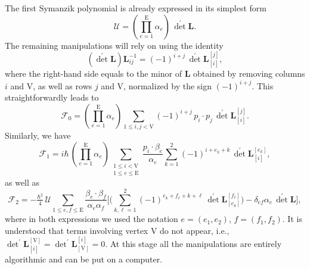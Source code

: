 \documentclass[12pt]{article}
\numberwithin{figure}{section}
\def \be {\begin{equation}}
\def \ee {\end{equation}}
\def \E {\mathrm{E}}
\def \U {\mathcal{U}}
\def \F {\mathcal{F}}
\def \leq {\leqslant}
\def \VV {\mathrm{V}}
\def \LL {\mathbf{L}}
\begin{document}
The first Symanzik polynomial is already expressed in its simplest form
%
\be
\U = ({\textstyle\prod}_{e=1}^{\E} \alpha_e)\, {\det}^\prime \mathbf{L}.
\ee
%
The remaining manipulations will rely on using the identity
%
\be
({\det}^\prime \LL) \LL_{ij}^{-1} = (-1)^{i+j}\, {\det}^\prime \LL_{[i]}^{[j]},
\ee
%
where the right-hand side equals to the minor of $\LL$ obtained by removing columns $i$ and $\VV$, as well as rows $j$ and $\VV$, normalized by the sign $(-1)^{i+j}$. This straightforwardly leads to
%
\be
\F_0 = ({\textstyle\prod}_{e=1}^{\E} \alpha_e)\!\! \sum_{1 \leq i, j < \VV} \!\!\! (-1)^{i+j}\, p_i {\cdot} p_j\, {\det}^\prime \LL_{[i]}^{[j]}.
\ee
%
Similarly, we have
%
\be
\F_1 = i\hbar\, ({\textstyle\prod}_{e=1}^{\E} \alpha_e)\!\! \sum_{\substack{1 \leq i < \VV\\ 1\leq e \leq \E}} \frac{p_i{\cdot}\beta_e}{\alpha_e} \sum_{k=1}^{2} (-1)^{i+e_k+k}\, {\det}^\prime \LL_{[i]}^{[e_k]},
\ee
%
as well as
%
\be
\F_2 = -\tfrac{\hbar^2}{4}\,\U \!\!\sum_{1\leq e, f \leq \E} \!\frac{\beta_e {\cdot} \beta_f}{\alpha_e \alpha_f} \bigg[ \bigg( \sum_{k,\ell=1}^{2} (-1)^{e_k + f_\ell + k + \ell}\, {\det}^\prime \LL_{[e_k]}^{[f_\ell]} \bigg) - \delta_{ef} \alpha_e\, {\det}^\prime \LL\bigg],
\ee
%
where in both expressions we used the notation $e = (e_1, e_2)$, $f = (f_1, f_2)$. It is understood that terms involving vertex $\VV$ do not appear, i.e., ${\det}^\prime \LL_{[i]}^{[\VV]} = {\det}^\prime \LL_{[\VV]}^{[i]}= 0$. At this stage all the manipulations are entirely algorithmic and can be put on a computer.
	
	
\newpage
{}


				
\end{document}

